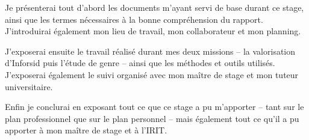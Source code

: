 	Je présenterai tout d'abord les documents m'ayant servi de base durant ce stage, ainsi que les termes nécessaires à la bonne compréhension du rapport. J'introduirai également mon lieu de travail, mon collaborateur et mon planning.
	
	J'exposerai ensuite le travail réalisé durant mes deux missions -- la valorisation d'Inforsid puis l'étude de genre -- ainsi que les méthodes et outils utilisés. J'exposerai également le suivi organisé avec mon maître de stage et mon tuteur universitaire.
	
	Enfin je conclurai en exposant tout ce que ce stage a pu m'apporter -- tant sur le plan professionnel que sur le plan personnel -- mais également tout ce qu'il a pu apporter à mon maître de stage et à l'IRIT.